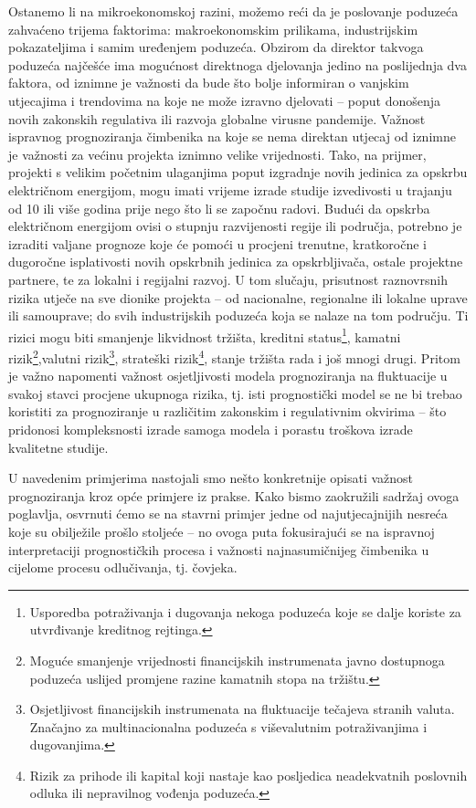 \documentclass[a4paper,12pt,oneside]{memoir}
\begin{document}
        Ostanemo li na mikroekonomskoj razini, možemo reći da je poslovanje poduzeća zahvaćeno trijema faktorima: makroekonomskim prilikama, industrijskim pokazateljima i samim uređenjem poduzeća. Obzirom da direktor takvoga poduzeća najčešće ima mogućnost direktnoga djelovanja jedino na poslijednja dva faktora, od iznimne je važnosti da bude što bolje informiran o vanjskim utjecajima i trendovima na koje ne može izravno djelovati -- poput donošenja novih zakonskih regulativa ili razvoja globalne virusne pandemije. Važnost ispravnog prognoziranja čimbenika na koje se nema direktan utjecaj od iznimne je važnosti za većinu projekta iznimno velike vrijednosti. Tako, na prijmer, projekti s velikim početnim ulaganjima poput izgradnje novih jedinica za opskrbu električnom energijom, mogu imati vrijeme izrade studije izvedivosti u trajanju od 10 ili više godina prije nego što li se započnu radovi. Budući da opskrba električnom energijom ovisi o stupnju razvijenosti regije ili područja, potrebno je izraditi valjane prognoze koje će pomoći u procjeni trenutne, kratkoročne i dugoročne isplativosti novih opskrbnih jedinica za opskrbljivača, ostale projektne partnere, te za lokalni i regijalni razvoj. U tom slučaju, prisutnost raznovrsnih rizika utječe na sve dionike projekta -- od nacionalne, regionalne ili lokalne uprave ili samouprave; do svih industrijskih poduzeća koja se nalaze na tom području. Ti rizici mogu biti smanjenje likvidnost tržišta, kreditni status\footnote{Usporedba potraživanja i dugovanja nekoga poduzeća koje se dalje koriste za utvrđivanje kreditnog rejtinga.}, kamatni rizik\footnote{Moguće smanjenje vrijednosti financijskih instrumenata javno dostupnoga poduzeća uslijed promjene razine kamatnih stopa na tržištu.},valutni rizik\footnote{Osjetljivost financijskih instrumenata na fluktuacije tečajeva stranih valuta. Značajno za multinacionalna poduzeća s viševalutnim potraživanjima i dugovanjima.}, strateški rizik\footnote{Rizik za prihode ili kapital koji nastaje kao posljedica neadekvatnih poslovnih odluka ili nepravilnog vođenja poduzeća.}, stanje tržišta rada i još mnogi drugi. Pritom je važno napomenti važnost osjetljivosti modela prognoziranja na fluktuacije u svakoj stavci procjene ukupnoga rizika, tj. isti prognostički model se ne bi trebao koristiti za prognoziranje u različitim zakonskim i regulativnim okvirima -- što pridonosi kompleksnosti izrade samoga modela i porastu troškova izrade kvalitetne studije.


        U navedenim primjerima nastojali smo nešto konkretnije opisati važnost prognoziranja kroz opće primjere iz prakse. Kako bismo zaokružili sadržaj ovoga poglavlja, osvrnuti ćemo se na stavrni primjer jedne od najutjecajnijih nesreća koje su obilježile prošlo stoljeće --  no ovoga puta fokusirajući se na ispravnoj interpretaciji prognostičkih procesa i važnosti najnasumičnijeg čimbenika u cijelome procesu odlučivanja, tj. čovjeka.
\end{document}
